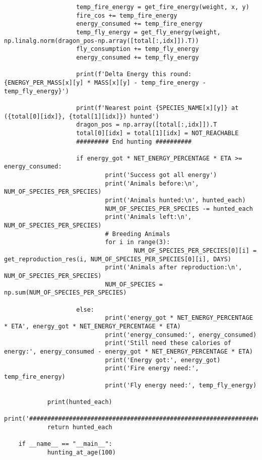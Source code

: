 \begin{lstlisting}
					temp_fire_energy = get_fire_energy(weight, x, y)
					fire_cos += temp_fire_energy
					energy_consumed += temp_fire_energy
					temp_fly_energy = get_fly_energy(weight, np.linalg.norm(dragon_pos-np.array([total[:,idx]]).T))
					fly_consumption += temp_fly_energy
					energy_consumed += temp_fly_energy
	
					print(f'Delta Energy this round: {ENERGY_PER_MASS[x][y] * MASS[x][y] - temp_fire_energy - temp_fly_energy}')
	
					print(f'Nearest point {SPECIES_NAME[x][y]} at ({total[0][idx]}, {total[1][idx]}) hunted')
					dragon_pos = np.array([total[:,idx]]).T
					total[0][idx] = total[1][idx] = NOT_REACHABLE
					######### End hunting ##########
					
					if energy_got * NET_ENERGY_PERCENTAGE * ETA >= energy_consumed:
							print('Success got all energy')
							print('Animals before:\n', NUM_OF_SPECIES_PER_SPECIES)
							print('Animals hunted:\n', hunted_each)
							NUM_OF_SPECIES_PER_SPECIES -= hunted_each
							print('Animals left:\n', NUM_OF_SPECIES_PER_SPECIES)
							# Breeding Animals
							for i in range(3):
									NUM_OF_SPECIES_PER_SPECIES[0][i] = get_reproduction_res(i, NUM_OF_SPECIES_PER_SPECIES[0][i], DAYS)
							print('Animals after reproduction:\n', NUM_OF_SPECIES_PER_SPECIES)
							NUM_OF_SPECIES = np.sum(NUM_OF_SPECIES_PER_SPECIES)
	
					else:
							print('energy_got * NET_ENERGY_PERCENTAGE * ETA', energy_got * NET_ENERGY_PERCENTAGE * ETA)
							print('energy_consumed:', energy_consumed)
							print('Still need these calories of energy:', energy_consumed - energy_got * NET_ENERGY_PERCENTAGE * ETA)
							print('Energy got:', energy_got)
							print('Fire energy need:', temp_fire_energy)
							print('Fly energy need:', temp_fly_energy)
	
			print(hunted_each)
			print('################################################################')
			return hunted_each
	
	if __name__ == "__main__":
			hunting_at_age(100)
\end{lstlisting}

% 
